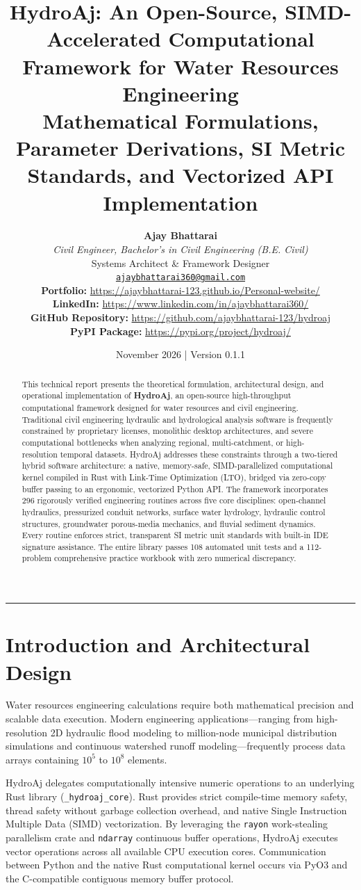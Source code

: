 \documentclass[11pt,a4paper]{article}
\title{\textbf{HydroAj: An Open-Source, SIMD-Accelerated Computational Framework for Water Resources Engineering}\\[0.5em]
\large Mathematical Formulations, Parameter Derivations, SI Metric Standards, and Vectorized API Implementation}
\author{
    \textbf{Ajay Bhattarai} \\
    \textit{Civil Engineer, Bachelor's in Civil Engineering (B.E. Civil)} \\
    Systems Architect \& Framework Designer \\
    \texttt{\href{mailto:ajaybhattarai360@gmail.com}{ajaybhattarai360@gmail.com}} \\[0.5em]
    \small \textbf{Portfolio:} \url{https://ajaybhattarai-123.github.io/Personal-website/} \\
    \small \textbf{LinkedIn:} \url{https://www.linkedin.com/in/ajaybhattarai360/} \\
    \small \textbf{GitHub Repository:} \url{https://github.com/ajaybhattarai-123/hydroaj} \\
    \small \textbf{PyPI Package:} \url{https://pypi.org/project/hydroaj/}
}
\date{November 2026 \quad | \quad Version 0.1.1}
\begin{document}
\maketitle

\begin{abstract}
\noindent This technical report presents the theoretical formulation, architectural design, and operational implementation of \textbf{HydroAj}, an open-source high-throughput computational framework designed for water resources and civil engineering. Traditional civil engineering hydraulic and hydrological analysis software is frequently constrained by proprietary licenses, monolithic desktop architectures, and severe computational bottlenecks when analyzing regional, multi-catchment, or high-resolution temporal datasets. HydroAj addresses these constraints through a two-tiered hybrid software architecture: a native, memory-safe, SIMD-parallelized computational kernel compiled in Rust with Link-Time Optimization (LTO), bridged via zero-copy buffer passing to an ergonomic, vectorized Python API. The framework incorporates 296 rigorously verified engineering routines across five core disciplines: open-channel hydraulics, pressurized conduit networks, surface water hydrology, hydraulic control structures, groundwater porous-media mechanics, and fluvial sediment dynamics. Every routine enforces strict, transparent SI metric unit standards with built-in IDE signature assistance. The entire library passes 108 automated unit tests and a 112-problem comprehensive practice workbook with zero numerical discrepancy.
\end{abstract}

\vspace{1em}
\hrule
\vspace{1em}

\section{Introduction and Architectural Design}
Water resources engineering calculations require both mathematical precision and scalable data execution. Modern engineering applications—ranging from high-resolution 2D hydraulic flood modeling to million-node municipal distribution simulations and continuous watershed runoff modeling—frequently process data arrays containing $10^5$ to $10^8$ elements. 

HydroAj delegates computationally intensive numeric operations to an underlying Rust library (\texttt{\_hydroaj\_core}). Rust provides strict compile-time memory safety, thread safety without garbage collection overhead, and native Single Instruction Multiple Data (SIMD) vectorization. By leveraging the \texttt{rayon} work-stealing parallelism crate and \texttt{ndarray} continuous buffer operations, HydroAj executes vector operations across all available CPU execution cores. Communication between Python and the native Rust computational kernel occurs via PyO3 and the C-compatible contiguous memory buffer protocol.
\end{document}
